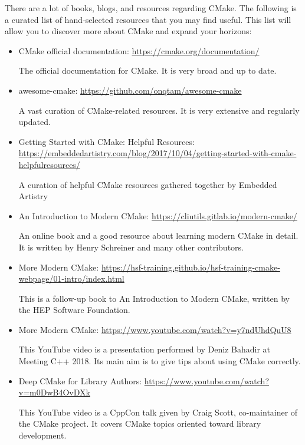 There are a lot of books, blogs, and resources regarding CMake. The following is a curated list of hand-selected resources that you may find useful. This list will allow you to discover more about CMake and expand your horizons:

\begin{itemize}
\item 
CMake official documentation: \url{https://cmake.org/documentation/}

The official documentation for CMake. It is very broad and up to date.
	
\item 
awesome-cmake: \url{https://github.com/onqtam/awesome-cmake}

A vast curation of CMake-related resources. It is very extensive and regularly updated.

\item 
Getting Started with CMake: Helpful Resources: \url{https://embeddedartistry.com/blog/2017/10/04/getting-started-with-cmake-helpfulresources/}

A curation of helpful CMake resources gathered together by Embedded Artistry

\item 
An Introduction to Modern CMake: \url{https://cliutils.gitlab.io/modern-cmake/}

An online book and a good resource about learning modern CMake in detail. It is
written by Henry Schreiner and many other contributors.

\item 
More Modern CMake: \url{https://hsf-training.github.io/hsf-training-cmake-webpage/01-intro/index.html}

This is a follow-up book to An Introduction to Modern CMake, written by the HEP Software Foundation.

\item 
More Modern CMake: \url{https://www.youtube.com/watch?v=y7ndUhdQuU8}

This YouTube video is a presentation performed by Deniz Bahadir at Meeting C++ 2018. Its main aim is to give tips about using CMake correctly.

\item 
Deep CMake for Library Authors: \url{https://www.youtube.com/watch?v=m0DwB4OvDXk}

This YouTube video is a CppCon talk given by Craig Scott, co-maintainer of the CMake project. It covers CMake topics oriented toward library development.


\end{itemize}
